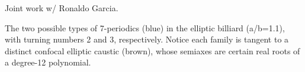 Joint work w/ Ronaldo Garcia.

The two possible types of 7-periodics (blue) in the elliptic billiard (a/b=1.1), with turning numbers 2 and 3, respectively. Notice each family is tangent to a distinct confocal elliptic caustic (brown), whose semiaxes are certain real roots of a degree-12 polynomial.